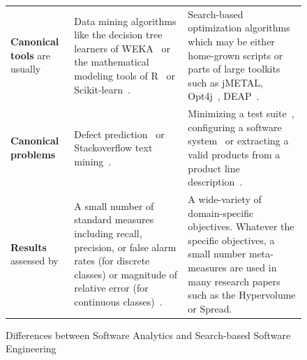 \documentclass[sigconf,anonymous,review]{acmart}
\begin{document}
\begin{figure}[t]
\begin{tabular}{@{}p{3cm}p{6cm}p{8.35cm}@{}}
                \rowcolor[HTML]{EFEFEF}\textbf{Canonical   tools} are usually
                &
                Data mining algorithms like  the decision
                tree learners of WEKA~\cite{hall2009weka} or the mathematical modeling tools of R~\cite{rmanual18} or Scikit-learn~\cite{scikit-learn}.
                &
                {Search-based} optimization algorithms which may be either home-grown scripts or parts of large toolkits such as jMETAL\cite{refs2jmetalDEE}, Opt4j~\cite{opt4jpaper}, DEAP~\cite{DEAP_JMLR2012}.
                \\ 
                \textbf{Canonical   problems}
                &
                Defect prediction~\cite{lessmann2008benchmarking}   or Stackoverflow text mining~\cite{fu2017easy}. 
                &
                Minimizing a test suite~\cite{fraser2007redundancy}, configuring a software system~\cite{nair2017faster} or extracting a valid products from a product line description~\cite{sayyad13b}.
                \\ 
                
                \rowcolor[HTML]{EFEFEF} \textbf{Results}   assessed by
                &
                A small number of standard measures
                including   recall, precision, or false alarm rates (for discrete classes)
                or magnitude of relative error (for continuous classes)~\cite{Shepperd2012}.
                &
                A wide-variety of domain-specific objectives.
                Whatever the specific objectives, a small number meta-measures are used in many research papers such as the Hypervolume or Spread. 
    \end{tabular}
    \caption{Differences between Software Analytics and Search-based Software Engineering}
    \label{fig:diff}
\end{figure}
\end{document}
